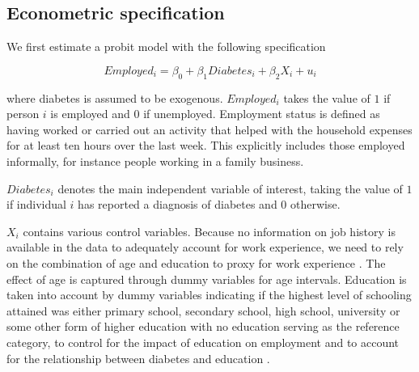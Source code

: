 \subsection{Econometric specification}

We first estimate a probit model with the following specification 


\begin{equation}
Employed_{i}=\beta_{0}+\beta_{1}Diabetes_{i}+\beta_{2}X_{i}+u_{i}\label{eq:employed-2}
\end{equation}


where diabetes is assumed to be exogenous. $Employed_{i}$
takes the value of $1$ if person $i$ is employed and $0$ if unemployed.
Employment status is defined as having worked or carried out an activity
that helped with the household expenses for at least ten hours over
the last week. This explicitly includes those employed informally,
for instance people working in a family business. 

$Diabetes_{i}$ denotes the main independent variable of interest, taking the value
of $1$ if individual $i$ has reported a diagnosis of diabetes and
$0$ otherwise. 

$X_{i}$ contains various control variables. Because
no information on job history is available in the data to adequately
account for work experience, we need to rely on the combination of
age and education to proxy for work experience \parencite{Aaronson2010}.
The effect of age is captured through dummy variables for age intervals.
Education is taken into account by dummy variables indicating if the
highest level of schooling attained was either primary school, secondary
school, high school, university or some other form of higher education
with no education serving as the reference category, to control for
the impact of education on employment and to account for the relationship
between diabetes and education \parencite{Agardh2011}. 


